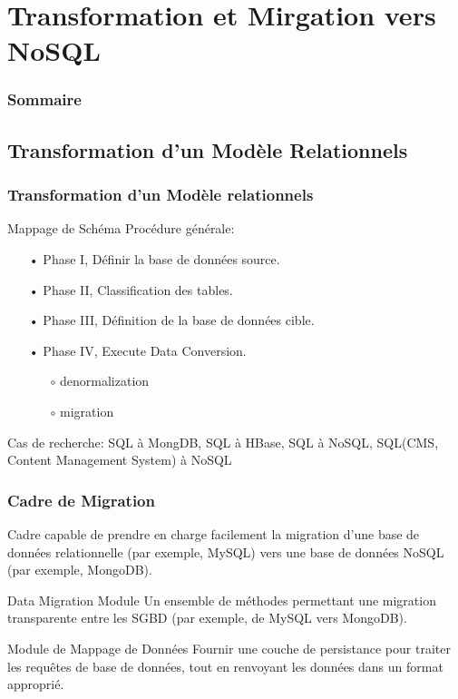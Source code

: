 \documentclass[xcolor=dvipsnames]{beamer}
\begin{document}
\section{Transformation et Mirgation vers NoSQL}
\begin{frame}
	\frametitle{Sommaire}
	\tableofcontents[currentsection]
\end{frame}

\subsection{Transformation d’un Modèle Relationnels}
\begin{frame}[fragile]
	\frametitle{Transformation d’un Modèle relationnels}
	\begin{block}{Mappage de Schéma}
		Procédure générale:
		\begin{itemize}
			\item[•] Phase I, Définir la base de données source.
			\item[•] Phase II, Classification des tables.
			\item[•] Phase III, Définition de la base de données cible.
			\item[•] Phase IV, Execute Data Conversion.
			\begin{itemize}
				\item[$\circ$] denormalization
				\item[$\circ$] migration
			\end{itemize}	
		\end{itemize}
		Cas de recherche:
		SQL à MongDB, SQL à HBase, SQL à NoSQL, SQL(CMS, Content Management System) à NoSQL
	\end{block}
\end{frame}

\begin{frame}[fragile]
	\frametitle{Cadre de Migration}
	Cadre capable de prendre en charge facilement la migration d’une base de données relationnelle (par exemple, MySQL) vers une base de données NoSQL (par exemple, MongoDB).
	\begin{block}{Data Migration Module}
		Un ensemble de méthodes permettant une migration transparente entre les SGBD (par exemple, de MySQL vers MongoDB).
	\end{block}
	\begin{block}{Module de Mappage de Données}
		Fournir une couche de persistance pour traiter les requêtes de base de données, tout en renvoyant les données dans un format approprié.
	\end{block}
\end{frame}
\end{document}

